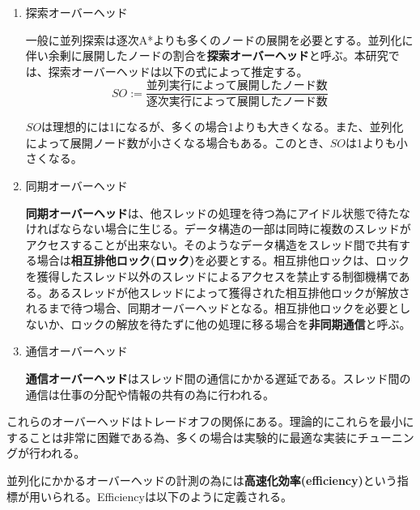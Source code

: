 \documentclass[uplatex]{jsarticle}
\begin{document}
\begin{enumerate}
\item 探索オーバーヘッド
\newline

一般に並列探索は逐次A*よりも多くのノードの展開を必要とする。並列化に伴い余剰に展開したノードの割合を\textbf{探索オーバーヘッド}と呼ぶ。本研究では、探索オーバーヘッドは以下の式によって推定する。
\newline
\begin{equation}
	SO := \frac{並列実行によって展開したノード数}{逐次実行によって展開したノード数}
\end{equation}


$SO$は理想的には1になるが、多くの場合1よりも大きくなる。また、並列化によって展開ノード数が小さくなる場合もある。このとき、$SO$は1よりも小さくなる。
\newline

\item 同期オーバーヘッド
\newline

\textbf{同期オーバーヘッド}は、他スレッドの処理を待つ為にアイドル状態で待たなければならない場合に生じる。データ構造の一部は同時に複数のスレッドがアクセスすることが出来ない。そのようなデータ構造をスレッド間で共有する場合は\textbf{相互排他ロック(ロック)}を必要とする。相互排他ロックは、ロックを獲得したスレッド以外のスレッドによるアクセスを禁止する制御機構である。あるスレッドが他スレッドによって獲得された相互排他ロックが解放されるまで待つ場合、同期オーバーヘッドとなる。相互排他ロックを必要としないか、ロックの解放を待たずに他の処理に移る場合を\textbf{非同期通信}と呼ぶ。
\newline

\item 通信オーバーヘッド
\newline

\textbf{通信オーバーヘッド}はスレッド間の通信にかかる遅延である。スレッド間の通信は仕事の分配や情報の共有の為に行われる。

\end{enumerate}

これらのオーバーヘッドはトレードオフの関係にある。理論的にこれらを最小にすることは非常に困難である為、多くの場合は実験的に最適な実装にチューニングが行われる。

並列化にかかるオーバーヘッドの計測の為には\textbf{高速化効率(efficiency)}という指標が用いられる。Efficiencyは以下のように定義される。
\end{document}
